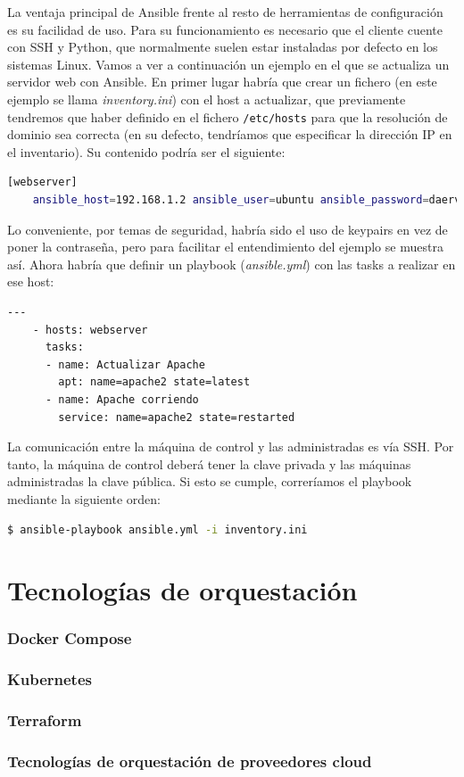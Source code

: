 	La ventaja principal de Ansible frente al resto de herramientas de configuración es su facilidad de uso. Para su funcionamiento es necesario que el cliente cuente con SSH y Python, que normalmente suelen estar instaladas por defecto en los sistemas Linux. Vamos a ver a continuación un ejemplo en el que se actualiza un servidor web con Ansible. En primer lugar habría que crear un fichero (en este ejemplo se llama \textit{inventory.ini}) con el host a actualizar, que previamente tendremos que haber definido en el fichero \texttt{/etc/hosts} para que la resolución de dominio sea correcta (en su defecto, tendríamos que especificar la dirección IP en el inventario). Su contenido podría ser el siguiente:
	
\clearpage
\begin{lstlisting}[language=Bash, caption=Contenido del fichero inventory.ini]
	[webserver]
	ansible_host=192.168.1.2 ansible_user=ubuntu ansible_password=daerv
\end{lstlisting}	
	
	Lo conveniente, por temas de seguridad, habría sido el uso de keypairs en vez de poner la contraseña, pero para facilitar el entendimiento del ejemplo se muestra así. Ahora habría que definir un playbook (\textit{ansible.yml}) con las tasks a realizar en ese host:

\vspace{0.2cm}
\begin{lstlisting}[language=Bash, caption=Contenido del fichero ansible.yml]
	---
	- hosts: webserver
	  tasks:
	  - name: Actualizar Apache 
	    apt: name=apache2 state=latest
	  - name: Apache corriendo  
	    service: name=apache2 state=restarted
\end{lstlisting}

	La comunicación entre la máquina de control y las administradas es vía SSH. Por tanto, la máquina de control deberá tener la clave privada y las máquinas administradas la clave pública. Si esto se cumple, correríamos el playbook mediante la siguiente orden:

\vspace{0.2cm}
\begin{lstlisting}[language=Bash]
        		$ ansible-playbook ansible.yml -i inventory.ini 
\end{lstlisting}
\clearpage

\section{Tecnologías de orquestación} \label{sec:orq}
\subsubsection{Docker Compose}
\subsubsection{Kubernetes}
\subsubsection{Terraform}
\subsubsection{Tecnologías de orquestación de proveedores cloud}
